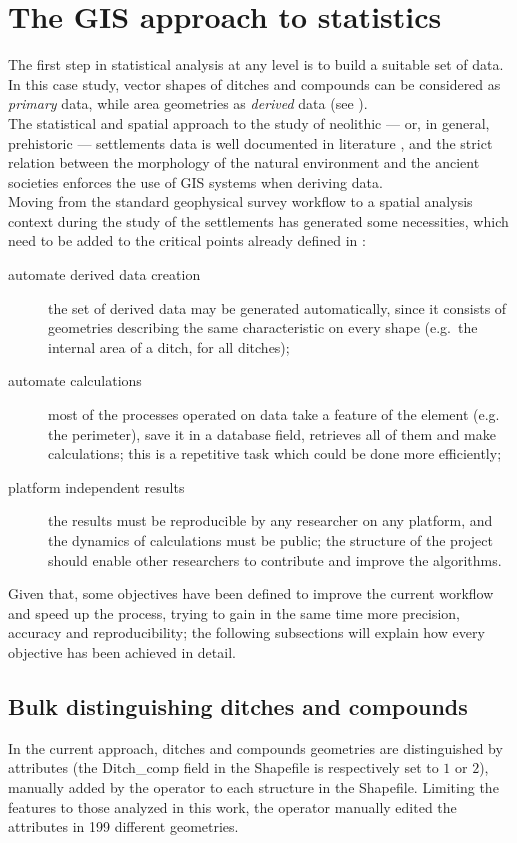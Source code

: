     \section{The GIS approach to statistics}
        The first step in statistical analysis at any level is to build a suitable set of data. In this case study, vector shapes of ditches and compounds can be considered as \emph{primary} data, while area geometries as \emph{derived} data (see ).\\
        The statistical and spatial approach to the study of neolithic --- or, in general, prehistoric --- settlements data is well documented in literature \cite{arch-location-model}, and the strict relation between the morphology of the natural environment and the ancient societies enforces the use of GIS systems when deriving data.\\
        Moving from the standard geophysical survey workflow to a spatial analysis context during the study of the settlements has generated some necessities, which need to be added to the critical points already defined in :

        \begin{description}
            \item[automate derived data creation] the set of derived data may be generated automatically, since it consists of geometries describing the same characteristic on every shape (e.g.\ the internal area of a ditch, for all ditches);
            \item[automate calculations] most of the processes operated on data take a feature of the element (e.g. the perimeter), save it in a database field, retrieves all of them and make calculations; this is a repetitive task which could be done more efficiently;
            \item[platform independent results] the results must be reproducible by any researcher on any platform, and the dynamics of calculations must be public; the structure of the project should enable other researchers to contribute and improve the algorithms.
        \end{description}

        Given that, some objectives have been defined to improve the current workflow and speed up the process, trying to gain in the same time more precision, accuracy and reproducibility; the following subsections will explain how every objective has been achieved in detail.

        \subsection{Bulk distinguishing ditches and compounds\label{sec:distinguish}}
            In the current approach, ditches and compounds geometries are distinguished by attributes (the \textsf{Ditch\_comp} field in the Shapefile is respectively set to $1$ or $2$), manually added by the operator to each structure in the Shapefile. Limiting the features to those analyzed in this work, the operator manually edited the attributes in 199 different geometries.


